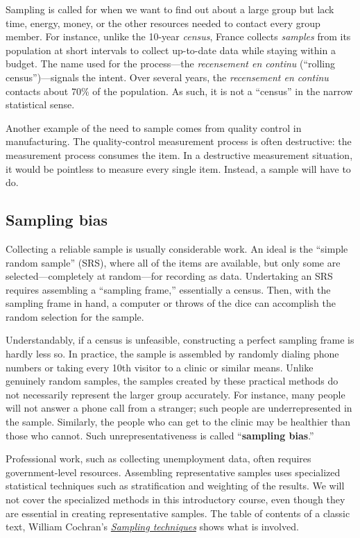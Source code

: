 \documentclass[
  letterpaper,
  DIV=11,
  numbers=noendperiod,
  oneside]{scrartcl}
\begin{document}
Sampling is called for when we want to find out about a large group but
lack time, energy, money, or the other resources needed to contact every
group member. For instance, unlike the 10-year \emph{census}, France
collects \emph{samples} from its population at short intervals to
collect up-to-date data while staying within a budget. The name used for
the process---the \emph{recensement en continu} (``rolling
census'')---signals the intent. Over several years, the
\emph{recensement en continu} contacts about 70\% of the population. As
such, it is not a ``census'' in the narrow statistical sense.

Another example of the need to sample comes from quality control in
manufacturing. The quality-control measurement process is often
destructive: the measurement process consumes the item. In a destructive
measurement situation, it would be pointless to measure every single
item. Instead, a sample will have to do.

\subsection{Sampling bias}\label{sampling-bias}

Collecting a reliable sample is usually considerable work. An ideal is
the ``simple random sample'' (SRS), where all of the items are
available, but only some are selected---completely at random---for
recording as data. Undertaking an SRS requires assembling a ``sampling
frame,'' essentially a census. Then, with the sampling frame in hand, a
computer or throws of the dice can accomplish the random selection for
the sample.

Understandably, if a census is unfeasible, constructing a perfect
sampling frame is hardly less so. In practice, the sample is assembled
by randomly dialing phone numbers or taking every 10th visitor to a
clinic or similar means. Unlike genuinely random samples, the samples
created by these practical methods do not necessarily represent the
larger group accurately. For instance, many people will not answer a
phone call from a stranger; such people are underrepresented in the
sample. Similarly, the people who can get to the clinic may be healthier
than those who cannot. Such unrepresentativeness is called
``\textbf{sampling bias}.''

Professional work, such as collecting unemployment data, often requires
government-level resources. Assembling representative samples uses
specialized statistical techniques such as stratification and weighting
of the results. We will not cover the specialized methods in this
introductory course, even though they are essential in creating
representative samples. The table of contents of a classic text, William
Cochran's
\href{https://ia801409.us.archive.org/35/items/Cochran1977SamplingTechniques_201703/Cochran_1977_Sampling\%20Techniques.pdf}{\emph{Sampling
techniques}} shows what is involved.
\end{document}
